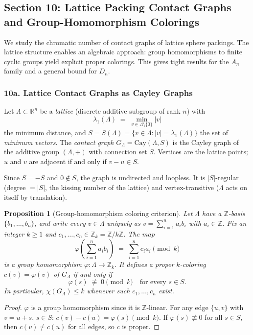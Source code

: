 \documentclass{article}
\newtheorem{proposition}[theorem]{Proposition}
\theoremstyle{definition}
\begin{document}
\subsection*{Section 10: Lattice Packing Contact Graphs and Group-Homomorphism Colorings}

We study the chromatic number of contact graphs of lattice sphere packings.  The lattice structure enables an algebraic approach: group homomorphisms to finite cyclic groups yield explicit proper colorings.  This gives tight results for the $A_n$ family and a general bound for $D_n$.

\subsubsection*{10a. Lattice Contact Graphs as Cayley Graphs}

Let $\Lambda \subset \mathbb{R}^n$ be a \emph{lattice} (discrete additive subgroup of rank $n$) with
\[
  \lambda_1(\Lambda) \;=\; \min_{v \in \Lambda \setminus \{0\}} |v|
\]
the minimum distance, and $S = S(\Lambda) = \{v \in \Lambda : |v| = \lambda_1(\Lambda)\}$ the set of \emph{minimum vectors}.  The \emph{contact graph} $G_\Lambda = \mathrm{Cay}(\Lambda, S)$ is the Cayley graph of the additive group $(\Lambda, +)$ with connection set $S$.  Vertices are the lattice points; $u$ and $v$ are adjacent if and only if $v - u \in S$.

Since $S = -S$ and $0 \notin S$, the graph is undirected and loopless.  It is $|S|$-regular (degree $= |S|$, the kissing number of the lattice) and vertex-transitive ($\Lambda$ acts on itself by translation).

\begin{proposition}[Group-homomorphism coloring criterion]\label{prop:coloring-criterion}
Let $\Lambda$ have a $\mathbb{Z}$-basis $\{b_1, \ldots, b_n\}$, and write every $v \in \Lambda$ uniquely as $v = \sum_{i=1}^n a_i b_i$ with $a_i \in \mathbb{Z}$.  Fix an integer $k \ge 1$ and $c_1, \ldots, c_n \in \mathbb{Z}_k = \mathbb{Z}/k\mathbb{Z}$.  The map
\[
  \varphi\!\left(\sum_{i=1}^n a_i b_i\right) \;=\; \sum_{i=1}^n c_i a_i \pmod{k}
\]
is a group homomorphism $\varphi : \Lambda \to \mathbb{Z}_k$.  It defines a proper $k$-coloring $c(v) = \varphi(v)$ of $G_\Lambda$ if and only if
\[
  \varphi(s) \;\not\equiv\; 0 \pmod{k} \quad \text{for every } s \in S.
\]
In particular, $\chi(G_\Lambda) \le k$ whenever such $c_1, \ldots, c_n$ exist.
\end{proposition}

\begin{proof}
$\varphi$ is a group homomorphism since it is $\mathbb{Z}$-linear.  For any edge $\{u, v\}$ with $v = u + s$, $s \in S$: $c(v) - c(u) = \varphi(s) \pmod{k}$.  If $\varphi(s) \not\equiv 0$ for all $s \in S$, then $c(v) \neq c(u)$ for all edges, so $c$ is proper.
\end{proof}
\end{document}
